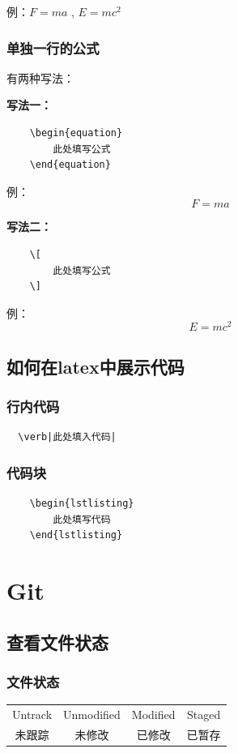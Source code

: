 \documentclass[UTF8]{ctexart}
\begin{document}
例：$F=ma$ , $E=mc^2$
\subsubsection{单独一行的公式}
有两种写法：

\textbf{写法一：}
\begin{lstlisting}
    \begin{equation}
        此处填写公式
    \end{equation}
\end{lstlisting}
\qquad 例：
\begin{equation}
    F=ma
\end{equation}

\textbf{写法二：}
\begin{lstlisting}
    \[
        此处填写公式
    \]
\end{lstlisting}
\qquad 例：
\[
    E=mc^2
\]

\subsection{如何在latex中展示代码} 
\subsubsection{行内代码} 
\begin{lstlisting}
  \verb|此处填入代码|
\end{lstlisting}

\subsubsection{代码块} 
\begin{Verbatim}
    \begin{lstlisting}
        此处填写代码
    \end{lstlisting}
\end{Verbatim}

\newpage
\section{Git}
\subsection{查看文件状态}
\subsubsection{文件状态}
\begin{table}[H]
    \centering
    \begin{tabular}{|c|c|c|c|}
        \hline
        Untrack & Unmodified & Modified & Staged\\
        未跟踪 & 未修改 & 已修改 & 已暂存\\
        \hline
    \end{tabular}
\end{table}
\end{document}
